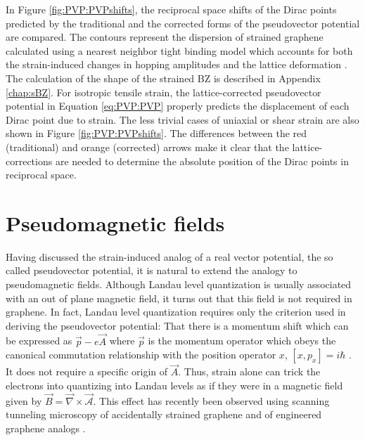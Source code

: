 In Figure \ref{fig:PVP:PVPshifts}, the reciprocal space shifts of the Dirac points predicted by the traditional and the corrected forms of the pseudovector potential are compared.
The contours represent the dispersion of strained graphene calculated using a nearest neighbor tight binding model which accounts for both the strain-induced changes in hopping amplitudes and the lattice deformation \cite{Pereira2009}.
The calculation of the shape of the strained BZ is described in Appendix \ref{chap:sBZ}.
For isotropic tensile strain, the lattice-corrected pseudovector potential in Equation \ref{eq:PVP:PVP} properly predicts the displacement of each Dirac point due to strain.
The less trivial cases of uniaxial or shear strain are also shown in Figure \ref{fig:PVP:PVPshifts}.
The differences between the red (traditional) and orange (corrected) arrows make it clear that the lattice-corrections are needed to determine the absolute position of the Dirac points in reciprocal space.

\section{Pseudomagnetic fields}
Having discussed the strain-induced analog of a real vector potential, the so called pseudovector potential, it is natural to extend the analogy to pseudomagnetic fields.
Although Landau level quantization is usually associated with an out of plane magnetic field, it turns out that this field is not required in graphene.
In fact, Landau level quantization requires only the criterion used in deriving the pseudovector potential: That there is a momentum shift which can be expressed as $\vec{p}-e\vec{A}$ where $\vec{p}$ is the momentum operator which obeys the canonical commutation relationship with the position operator $x$, $[x,p_x]=i \hbar$ \cite{Goerbig2011}.
It does not require a specific origin of $\vec{A}$.
Thus, strain alone can trick the electrons into quantizing into Landau levels as if they were in a magnetic field given by $\vec{B}=\vec{\nabla}\times\vec{\mathcal{A}}$.
This effect has recently been observed using scanning tunneling microscopy of accidentally strained graphene \cite{Levy2010,Yan2012,Yeh2011} and of engineered graphene analogs \cite{Gomes2012}.


